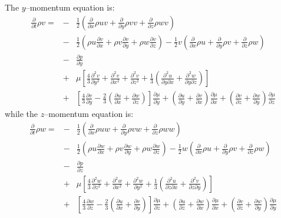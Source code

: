 \documentclass[dvips]{article}
\begin{document}
The $y$--momentum equation is:
\begin{eqnarray}
\frac{\partial}{\partial t}\rho v =
& - & \frac{1}{2}\left(
 \frac{\partial}{\partial x}\rho u v 
+\frac{\partial}{\partial y}\rho v v 
+\frac{\partial}{\partial z}\rho w v
                 \right) \nonumber\\
& - & \frac{1}{2}\left(
 \rho u\frac{\partial v}{\partial x}
+\rho v\frac{\partial v}{\partial y}
+\rho w\frac{\partial v}{\partial z}
                 \right)
-\frac{1}{2}v\left(
 \frac{\partial}{\partial x}\rho u
+\frac{\partial}{\partial y}\rho v
+\frac{\partial}{\partial z}\rho w
             \right) \nonumber\\
& - & \frac{\partial p}{\partial y} \nonumber\\
& + & \mu\left[
\frac{4}{3}\frac{\partial^{2}v}{\partial y^{2}}
          +\frac{\partial^{2}v}{\partial x^{2}}
          +\frac{\partial^{2}v}{\partial z^{2}}
+\frac{1}{3}\left(
 \frac{\partial^{2}u}{\partial y\partial x}
+\frac{\partial^{2}w}{\partial y\partial z}
            \right)
\right]\nonumber\\
& + & \left[
\frac{4}{3}\frac{\partial v}{\partial y}
-\frac{2}{3}\left(
 \frac{\partial u}{\partial x}
+\frac{\partial w}{\partial z}
            \right)
      \right]\frac{\partial \mu}{\partial y}
+\left(
 \frac{\partial u}{\partial y}
+\frac{\partial v}{\partial x}
 \right)\frac{\partial \mu}{\partial x}
+\left(
 \frac{\partial v}{\partial z}
+\frac{\partial w}{\partial y}
 \right)\frac{\partial \mu}{\partial z}
\label{EYMOMENTUM}
\end{eqnarray}
while the $z$--momentum equation is:
\begin{eqnarray}
\frac{\partial}{\partial t}\rho w =
& - & \frac{1}{2}\left(
 \frac{\partial}{\partial x}\rho u w 
+\frac{\partial}{\partial y}\rho v w 
+\frac{\partial}{\partial z}\rho w w
                 \right) \nonumber\\
& - & \frac{1}{2}\left(
 \rho u\frac{\partial w}{\partial x}
+\rho v\frac{\partial w}{\partial y}
+\rho w\frac{\partial w}{\partial z}
                 \right)
-\frac{1}{2}w\left(
 \frac{\partial}{\partial x}\rho u
+\frac{\partial}{\partial y}\rho v
+\frac{\partial}{\partial z}\rho w
             \right) \nonumber\\
& - & \frac{\partial p}{\partial z} \nonumber\\
& + & \mu\left[
\frac{4}{3}\frac{\partial^{2}w}{\partial z^{2}}
          +\frac{\partial^{2}w}{\partial x^{2}}
          +\frac{\partial^{2}w}{\partial y^{2}}
+\frac{1}{3}\left(
 \frac{\partial^{2}u}{\partial z\partial x}
+\frac{\partial^{2}v}{\partial z\partial y}
            \right)
\right]\nonumber\\
& + & \left[
\frac{4}{3}\frac{\partial w}{\partial z}
-\frac{2}{3}\left(
 \frac{\partial u}{\partial x}
+\frac{\partial v}{\partial y}
            \right)
      \right]\frac{\partial \mu}{\partial z}
+\left(
 \frac{\partial u}{\partial z}
+\frac{\partial w}{\partial x}
 \right)\frac{\partial \mu}{\partial x}
+\left(
 \frac{\partial v}{\partial z}
+\frac{\partial w}{\partial y}
 \right)\frac{\partial \mu}{\partial y}
\label{EZMOMENTUM}
\end{eqnarray}
\end{document}
